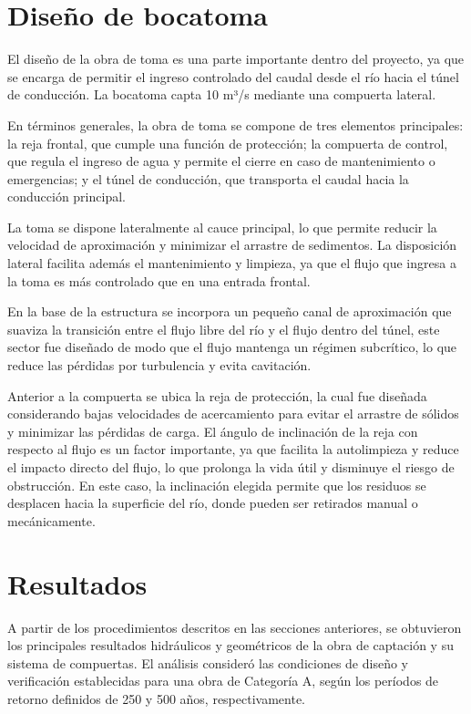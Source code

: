 \documentclass{article} %
\begin{document}
\section{Diseño de bocatoma}
El diseño de la obra de toma es una parte importante dentro del proyecto, ya que se  encarga de permitir el ingreso controlado del caudal desde el río hacia el túnel de conducción. La bocatoma capta 10 m³/s mediante una compuerta lateral.

En términos generales, la obra de toma se compone de tres elementos principales: la reja frontal, que cumple una función de protección; la compuerta de control, que regula el ingreso de agua y permite el cierre en caso de mantenimiento o emergencias; y el túnel de conducción, que transporta el caudal hacia la conducción principal.

La toma se dispone lateralmente al cauce principal, lo que permite reducir la velocidad de aproximación y minimizar el arrastre de sedimentos. La disposición lateral facilita además el mantenimiento y limpieza, ya que el flujo que ingresa a la toma es más controlado que en una entrada frontal.

En la base de la estructura se incorpora un pequeño canal de aproximación que suaviza la transición entre el flujo libre del río y el flujo dentro del túnel, este sector fue diseñado de modo que el flujo mantenga un régimen subcrítico, lo que reduce las pérdidas por turbulencia y evita cavitación.

Anterior a la compuerta se ubica la reja de protección, la cual fue diseñada considerando bajas velocidades de acercamiento para evitar el arrastre de sólidos y minimizar las pérdidas de carga. El ángulo de inclinación de la reja con respecto al flujo es un factor importante, ya que facilita la autolimpieza y reduce el impacto directo del flujo, lo que prolonga la vida útil y disminuye el riesgo de obstrucción. En este caso, la inclinación elegida permite que los residuos se desplacen hacia la superficie del río, donde pueden ser retirados manual o mecánicamente. 




\newpage
\section{Resultados}


A partir de los procedimientos descritos en las secciones anteriores, se obtuvieron los principales resultados hidráulicos y geométricos de la obra de captación y su sistema de compuertas. El análisis consideró las condiciones de diseño y verificación establecidas para una obra de Categoría A, según los períodos de retorno definidos de 250 y 500 años, respectivamente.
\end{document}
